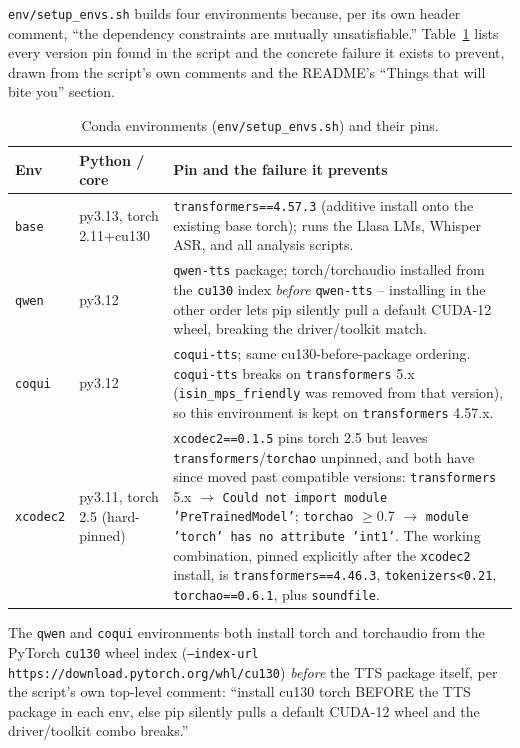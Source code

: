 \documentclass[11pt]{article}
\begin{document}
\texttt{env/setup\_envs.sh} builds four environments because, per its own
header comment, ``the dependency constraints are mutually unsatisfiable.''
Table~\ref{tab:envs} lists every version pin found in the script and the
concrete failure it exists to prevent, drawn from the script's own comments
and the README's ``Things that will bite you'' section.

\begin{table}[h]
\centering
\caption{Conda environments (\texttt{env/setup\_envs.sh}) and their pins.}
\label{tab:envs}
\small
\begin{tabular}{@{}lp{2.6cm}p{8.6cm}@{}}
\toprule
Env & Python / core & Pin and the failure it prevents \\
\midrule
\texttt{base} & py3.13, torch 2.11+cu130 & \texttt{transformers==4.57.3} (additive install onto
  the existing base torch); runs the Llasa LMs, Whisper ASR, and all analysis
  scripts. \\
\texttt{qwen} & py3.12 & \texttt{qwen-tts} package; torch/torchaudio installed from the
  \texttt{cu130} index \emph{before} \texttt{qwen-tts} -- installing in the
  other order lets pip silently pull a default CUDA-12 wheel, breaking the
  driver/toolkit match. \\
\texttt{coqui} & py3.12 & \texttt{coqui-tts}; same cu130-before-package ordering.
  \texttt{coqui-tts} breaks on \texttt{transformers} 5.x
  (\texttt{isin\_mps\_friendly} was removed from that version), so this
  environment is kept on \texttt{transformers} 4.57.x. \\
\texttt{xcodec2} & py3.11, torch 2.5 (hard-pinned) & \texttt{xcodec2==0.1.5} pins torch 2.5 but
  leaves \texttt{transformers}/\texttt{torchao} unpinned, and both have since
  moved past compatible versions: \texttt{transformers} 5.x $\to$
  \texttt{Could not import module 'PreTrainedModel'}; \texttt{torchao}
  $\ge$0.7 $\to$ \texttt{module 'torch' has no attribute 'int1'}. The working
  combination, pinned explicitly after the \texttt{xcodec2} install, is
  \texttt{transformers==4.46.3}, \texttt{tokenizers<0.21},
  \texttt{torchao==0.6.1}, plus \texttt{soundfile}. \\
\bottomrule
\end{tabular}
\end{table}

The \texttt{qwen} and \texttt{coqui} environments both install torch and
torchaudio from the PyTorch \texttt{cu130} wheel index
(\texttt{--index-url} \texttt{https://download.pytorch.org/\allowbreak whl/cu130})
\emph{before} the TTS package itself, per the script's own top-level
comment: ``install cu130 torch BEFORE the TTS package in each env, else pip
silently pulls a default CUDA-12 wheel and the driver/toolkit combo breaks.''
\end{document}
